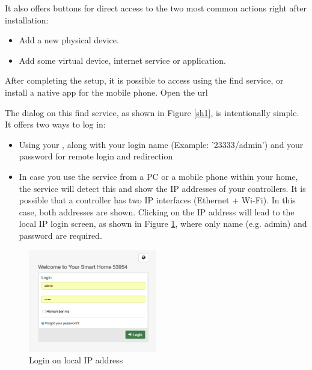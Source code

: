 It also offers buttons for direct access to the two most common actions right after installation:

\begin{itemize}
\item Add a new physical device.
\item Add some virtual device, internet service or application.
\end{itemize}

After completing the setup, it is possible to access \zway using the find service, or install 
a native app for the mobile phone. Open the url 

The dialog on this find service, as shown in Figure \ref{sh1}, is intentionally 
simple. It offers two ways to log in:

\begin{itemize}
\item Using your \zwaydeviceid, along with your login name (Example: '23333/admin') and 
your password for remote login and redirection
\item In case you use the service from a PC or a mobile phone within your home, the 
service will detect this and show the IP addresses of your \zway controllers. It 
is possible that a \zway controller has two IP interfaces (Ethernet + Wi-Fi). In 
this case, both addresses are shown. Clicking on the IP address will lead to the 
local IP login screen, as shown in Figure \ref{init2}, where only name (e.g. admin) and 
password are required.
\end{itemize}

\begin{figure}
\begin{center}
\includegraphics[width=0.5\textwidth]{pngs/cap3/init2.png}
\caption{Login on local IP address}
\label{init2}
\end{center}
\end{figure}

